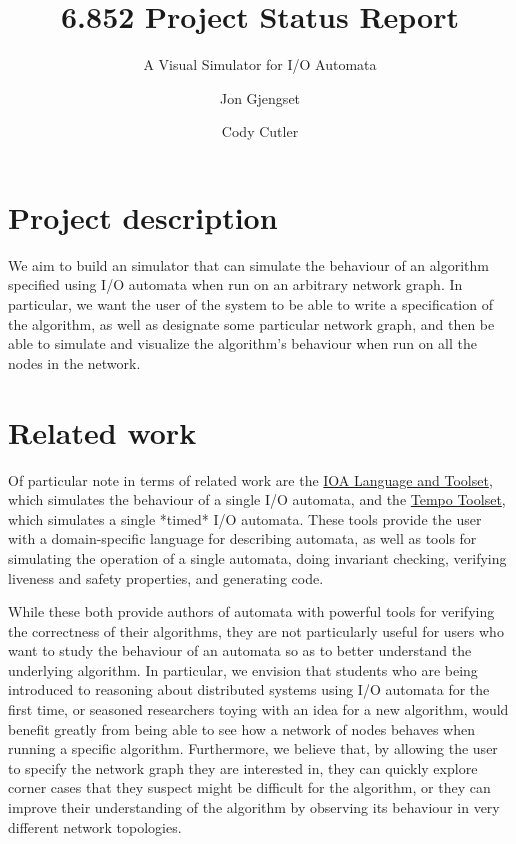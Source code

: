 \documentclass{scrartcl}
\title{6.852 Project Status Report}
\subtitle{A Visual Simulator for I/O Automata}
\author{Jon Gjengset \and Cody Cutler}
\begin{document}
\maketitle

\section{Project description}

We aim to build an simulator that can simulate the behaviour of an algorithm
specified using I/O automata when run on an arbitrary network graph. In
particular, we want the user of the system to be able to write a specification
of the algorithm, as well as designate some particular network graph, and then
be able to simulate and visualize the algorithm's behaviour when run on all the
nodes in the network.

\section{Related work}

Of particular note in terms of related work are the
\href{http://groups.csail.mit.edu/tds/ioa/}{IOA Language and Toolset}, which
simulates the behaviour of a single I/O automata, and the
\href{http://www.veromodo.com/}{Tempo Toolset}, which simulates a single
*timed* I/O automata. These tools provide the user with a domain-specific
language for describing automata, as well as tools for simulating the operation
of a single automata, doing invariant checking, verifying liveness and safety
properties, and generating code.

While these both provide authors of automata with powerful tools for verifying
the correctness of their algorithms, they are not particularly useful for
users who want to study the behaviour of an automata so as to better understand
the underlying algorithm. In particular, we envision that students who are
being introduced to reasoning about distributed systems using I/O automata for
the first time, or seasoned researchers toying with an idea for a new
algorithm, would benefit greatly from being able to see how a network of nodes
behaves when running a specific algorithm. Furthermore, we believe that, by
allowing the user to specify the network graph they are interested in, they can
quickly explore corner cases that they suspect might be difficult for the
algorithm, or they can improve their understanding of the algorithm by
observing its behaviour in very different network topologies.
\end{document}
